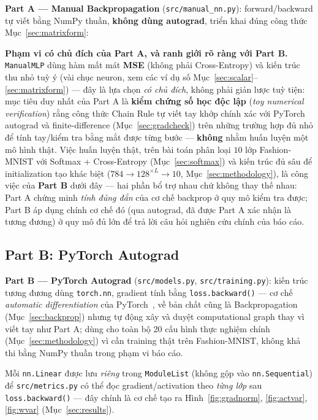 \documentclass[12pt,a4paper]{article}
\newcommand{\en}[1]{\textit{#1}}
\begin{document}
\textbf{Part A --- Manual Backpropagation} (\texttt{src/manual\_nn.py}):
forward/backward tự viết bằng NumPy thuần, \textbf{không dùng autograd},
triển khai đúng công thức Mục~\ref{sec:matrixform}:


\textbf{Phạm vi có chủ đích của Part A, và ranh giới rõ ràng với Part B.}
\texttt{ManualMLP} dùng hàm mất mát \textbf{MSE} (không phải
Cross-Entropy) và kiến trúc thu nhỏ tuỳ ý (vài chục neuron, xem các ví dụ
số Mục~\ref{sec:scalar}--\ref{sec:matrixform}) --- đây là lựa chọn
\emph{có chủ đích}, không phải giản lược tuỳ tiện: mục tiêu duy nhất của
Part A là \textbf{kiểm chứng số học độc lập} (\en{toy numerical
verification}) rằng công thức Chain Rule tự viết tay khớp chính xác với
PyTorch autograd và finite-difference (Mục~\ref{sec:gradcheck}) trên
những trường hợp đủ nhỏ để tính tay/kiểm tra bằng mắt được từng bước ---
\textbf{không} nhằm huấn luyện một mô hình thật. Việc huấn luyện thật,
trên bài toán phân loại $10$ lớp Fashion-MNIST với Softmax + Cross-Entropy
(Mục~\ref{sec:softmax}) và kiến trúc đủ sâu để initialization tạo khác
biệt ($784\to128^{\times L}\to10$, Mục~\ref{sec:methodology}), là công
việc của \textbf{Part B} dưới đây --- hai phần bổ trợ nhau chứ không thay
thế nhau: Part A chứng minh \emph{tính đúng đắn} của cơ chế backprop ở
quy mô kiểm tra được; Part B áp dụng chính cơ chế đó (qua autograd, đã
được Part A xác nhận là tương đương) ở quy mô đủ lớn để trả lời câu hỏi
nghiên cứu chính của báo cáo.

\subsection{Part B: PyTorch Autograd}

\textbf{Part B --- PyTorch Autograd} (\texttt{src/models.py},
\texttt{src/training.py}): kiến trúc tương đương dùng \texttt{torch.nn},
gradient tính bằng \texttt{loss.backward()} --- cơ chế \en{automatic
differentiation} của PyTorch~\citep{paszke2019pytorch}, về bản chất cũng
là Backpropagation (Mục~\ref{sec:backprop}) nhưng tự động xây và duyệt
computational graph thay vì viết tay như Part A; dùng cho toàn bộ 20 cấu
hình thực nghiệm chính (Mục~\ref{sec:methodology}) vì cần training thật
trên Fashion-MNIST, không khả thi bằng NumPy thuần trong phạm vi báo cáo.


Mỗi \texttt{nn.Linear} được lưu \emph{riêng} trong \texttt{ModuleList}
(không gộp vào \texttt{nn.Sequential}) để \texttt{src/metrics.py} có thể
đọc gradient/activation theo \emph{từng lớp} sau \texttt{loss.backward()}
--- đây chính là cơ chế tạo ra Hình~\ref{fig:gradnorm}, \ref{fig:actvar},
\ref{fig:wvar} (Mục~\ref{sec:results}).
\end{document}
